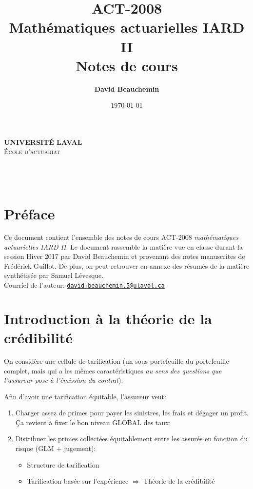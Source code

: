 \documentclass[11pt,french]{report}
\title{ACT-2008 \\ Mathématiques actuarielles IARD II \\ Notes de cours}
\author{\textbf{David Beauchemin}}
\date{\today}
\begin{document}
\makeatletter
  \begin{titlepage}
  \centering
      {\large \textbf{\textsc{UNIVERSITÉ LAVAL}}}\\
      \textsc{École d'actuariat}\\
    \vspace{2cm}
    \vspace{2cm}
      {\LARGE \textbf{\@title}} \\
    \vfill
       {\large \@author} \\
    \vspace{4cm}
        {\large\textbf{\@date}}\\
    \vfill
  \end{titlepage}
\makeatother
\tableofcontents

\chapter*{Préface}
Ce document contient l'ensemble des notes de cours ACT-2008 \textit{mathématiques actuarielles IARD II}. Le document rassemble la matière vue en classe durant la session Hiver 2017 par David Beauchemin et provenant des notes manuscrites de Frédérick Guillot.
De plus, on peut retrouver en annexe des résumés de la matière synthétisée par Samuel Lévesque.
\\
Courriel de l'auteur: \href{mailto:david.beauchemin.5@ulaval.ca}{\nolinkurl{david.beauchemin.5@ulaval.ca}}

\chapter{Introduction à la théorie de la crédibilité}
\label{chap:1:intro}

On considère une cellule de tarification (un sous-portefeuille du portefeuille complet, mais qui a les mêmes caractéristiques \textit{au sens des questions que l'assureur pose à l'émission du contrat}).

Afin d'avoir une tarification équitable, l'assureur veut:
\begin{enumerate}
\item Charger assez de primes pour payer les sinistres, les frais et dégager un profit. Ça revient à fixer le bon niveau GLOBAL des taux;
\item Distribuer les primes collectées équitablement entre les assurés en fonction du risque (GLM + jugement):
	\begin{itemize}
	\item Structure de tarification
	\item Tarification basée sur l'expérience $\Rightarrow$ Théorie de la crédibilité
	\end{itemize}	 
\end{enumerate}
\end{document}
